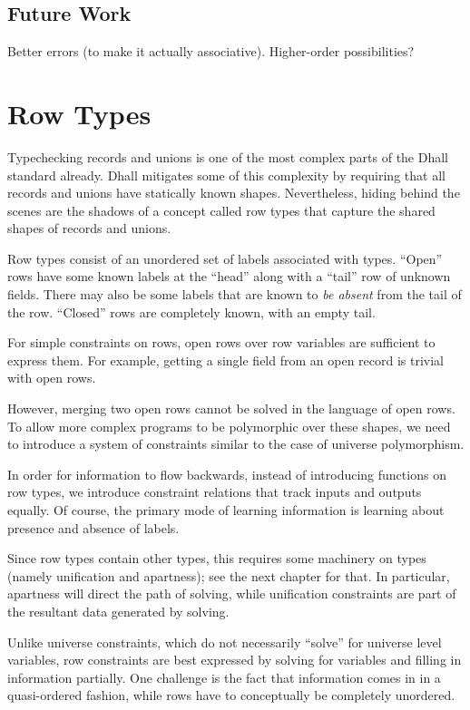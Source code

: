 \documentclass[11pt, twoside, reqno]{book}
\begin{document}
\section{Future Work}
Better errors (to make it actually associative).
Higher-order possibilities?





\chapter{Row Types}
Typechecking records and unions is one of the most complex parts of the Dhall standard already.
Dhall mitigates some of this complexity by requiring that all records and unions have statically known shapes.
Nevertheless, hiding behind the scenes are the shadows of a concept called row types that capture the shared shapes of records and unions.

Row types consist of an unordered set of labels associated with types.
``Open'' rows have some known labels at the ``head'' along with a ``tail'' row of unknown fields.
There may also be some labels that are known to \emph{be absent} from the tail of the row.
``Closed'' rows are completely known, with an empty tail.

For simple constraints on rows, open rows over row variables are sufficient to express them.
For example, getting a single field from an open record is trivial with open rows.

However, merging two open rows cannot be solved in the language of open rows.
To allow more complex programs to be polymorphic over these shapes, we need to introduce a system of constraints similar to the case of universe polymorphism.

In order for information to flow backwards, instead of introducing functions on row types, we introduce constraint relations that track inputs and outputs equally.
Of course, the primary mode of learning information is learning about presence and absence of labels.

Since row types contain other types, this requires some machinery on types (namely unification and apartness); see the next chapter for that.
In particular, apartness will direct the path of solving, while unification constraints are part of the resultant data generated by solving.

Unlike universe constraints, which do not necessarily “solve” for universe level variables, row constraints are best expressed by solving for variables and filling in information partially.
One challenge is the fact that information comes in in a quasi-ordered fashion, while rows have to conceptually be completely unordered.
\end{document}
